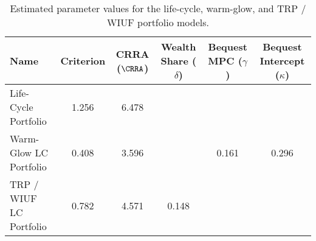 \begin{table}\centering
    \begin{tabular}{lccccc}
        \toprule
        Name                   & Criterion & CRRA ($\CRRA $) & Wealth Share ($\delta $) & Bequest MPC ($ \gamma $) & Bequest Intercept ($ \kappa $) \\
        \midrule
        Life-Cycle Portfolio   & 1.256     & 6.478          &                         &                           &                                 \\
        Warm-Glow LC Portfolio & 0.408     & 3.596          &                         & 0.161                     & 0.296                          \\
        TRP / WIUF LC Portfolio       & 0.782     & 4.571          & 0.148                   &                           &                                 \\
        \bottomrule
    \end{tabular}
    \caption{Estimated parameter values for the life-cycle, warm-glow, and TRP / WIUF portfolio models.}
    \label{parameters}
\end{table}